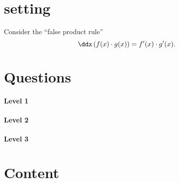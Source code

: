 \documentclass{ximera}
\begin{document}
\section{setting}

Consider the ``false product rule''
\[
\ddx\left(f(x) \cdot g(x)\right) = f'(x)\cdot g'(x).
\]


\section{Questions}

\paragraph{Level 1}

\paragraph{Level 2}

\paragraph{Level 3}


\section{Content}
\end{document}
